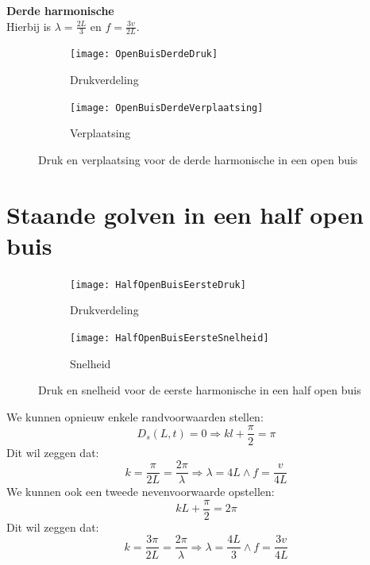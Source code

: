 \documentclass[a4paper,kul]{kulakarticle} %
\begin{document}
\textbf{Derde harmonische}\\
Hierbij is $\lambda = \frac{2L}{3}$ en $f=\frac{3v}{2L}$.

\begin{figure}[!h]
	\centering
	\begin{subfigure}{.5\textwidth}
		\centering
		\texttt{[image: OpenBuisDerdeDruk]}
		\caption{Drukverdeling}
		\label{fig:DerdeBuisDruk}
	\end{subfigure}%
	\begin{subfigure}{.5\textwidth}
		\centering
		\texttt{[image: OpenBuisDerdeVerplaatsing]}
		\caption{Verplaatsing}
		\label{fig:DerdeBuisVerplaatsing}
	\end{subfigure}
	\caption{Druk en verplaatsing voor de derde harmonische in een open buis}
	\label{fig:OpenBuisDerde}
\end{figure}
\newpage
\section{Staande golven in een half open buis}
\begin{figure}[!h]
	\centering
	\begin{subfigure}{.5\textwidth}
		\centering
		\texttt{[image: HalfOpenBuisEersteDruk]}
		\caption{Drukverdeling}
		\label{fig:EersteHalfBuisDruk}
	\end{subfigure}%
	\begin{subfigure}{.5\textwidth}
		\centering
		\texttt{[image: HalfOpenBuisEersteSnelheid]}
		\caption{Snelheid}
		\label{fig:EersteHalfBuisSnelheid}
	\end{subfigure}
	\caption{Druk en snelheid voor de eerste harmonische in een half open buis}
	\label{fig:HalfOpenBuisEerste}
\end{figure}
We kunnen opnieuw enkele randvoorwaarden stellen:
\begin{equation*}
	D_s(L,t)=0\Rightarrow kl+\frac{\pi}{2} = \pi
\end{equation*}
Dit wil zeggen dat:
\begin{equation*}
	k=\frac{\pi}{2L}=\frac{2\pi}{\lambda}\Rightarrow \lambda=4L \wedge f=\frac{v}{4L}
\end{equation*}
We kunnen ook een tweede nevenvoorwaarde opstellen:
\begin{equation*}
	kL+\frac{\pi}{2}=2\pi
\end{equation*}
Dit wil zeggen dat:
\begin{equation*}
	k=\frac{3\pi}{2L}=\frac{2\pi}{\lambda}\Rightarrow \lambda=\frac{4L}{3} \wedge f=\frac{3v}{4L}
\end{equation*}
\newpage
\end{document}
